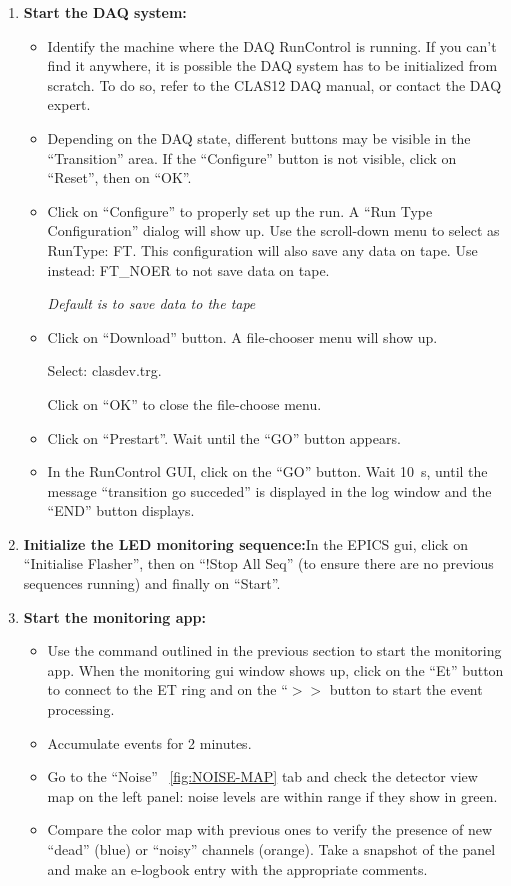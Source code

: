 \documentclass[11.5pt]{article}
\begin{document}
\begin{enumerate}
\item{\textbf{Start the DAQ system: }}
\begin{itemize}
\item Identify the machine where the DAQ RunControl is running. If you can't find it anywhere, it is possible the DAQ system has to be initialized from scratch. To do so, refer to the CLAS12 DAQ manual, or contact the DAQ expert.
\item Depending on the DAQ state, different buttons may be visible in the ``Transition'' area. If the ``Configure'' button is not visible, click on ``Reset'', then on ``OK''.
\item Click on ``Configure'' to properly set up the run. A ``Run Type Configuration'' dialog will show up. Use the scroll-down menu to select as RunType: FT. This configuration will also save any data on tape. Use instead: FT\_NOER to not save data on tape.

\textit{Default is to save data to the tape}
\item{Click on ``Download'' button. A file-chooser menu will show up.

Select: clasdev.trg. 

Click on ``OK'' to close the file-choose menu.
}
\item{Click on ``Prestart''.  Wait until the ``GO'' button appears.}
\item{In the RunControl GUI, click on the ``GO'' button. Wait 10~s, until the message ``transition go succeded'' is displayed in the log window and the ``END'' button displays.}
\end{itemize}

\item{\textbf{Initialize the LED monitoring sequence:}In the EPICS gui, click on ``Initialise Flasher'', then on ``!Stop All Seq'' (to ensure there are no previous sequences running) and finally on ``Start''. }
\item{\textbf{Start the monitoring app: }}
\begin{itemize}
\item{Use the command outlined in the previous section to start the monitoring app. When the monitoring gui window shows up, click on the ``Et'' button to connect to the ET ring and on the ``$>>$ button to start the event processing. }
\item{Accumulate events for 2 minutes.}
\item{Go to the ``Noise'' ~\ref{fig:NOISE-MAP}
    tab and check the detector view map on the left panel: noise levels are within range if they show in green.}
\item{Compare the color map with previous ones to verify the presence of new ``dead'' (blue) or ``noisy'' channels (orange). Take a snapshot of the panel and make an e-logbook entry with the appropriate comments.}


\end{itemize}
\end{enumerate}
\end{document}
